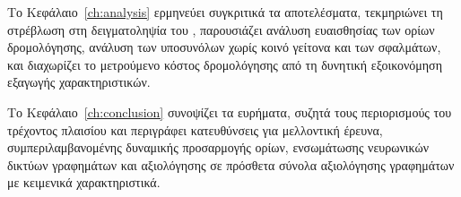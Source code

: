 Το Κεφάλαιο~\ref{ch:analysis} ερμηνεύει συγκριτικά τα αποτελέσματα, τεκμηριώνει
τη στρέβλωση στη δειγματοληψία του , παρουσιάζει ανάλυση ευαισθησίας των ορίων δρομολόγησης, ανάλυση των υποσυνόλων χωρίς κοινό γείτονα και των σφαλμάτων, και
διαχωρίζει το μετρούμενο κόστος δρομολόγησης από τη δυνητική εξοικονόμηση
εξαγωγής χαρακτηριστικών.

Το Κεφάλαιο~\ref{ch:conclusion} συνοψίζει τα ευρήματα, συζητά τους περιορισμούς του τρέχοντος
πλαισίου και περιγράφει κατευθύνσεις για μελλοντική έρευνα, συμπεριλαμβανομένης
δυναμικής προσαρμογής ορίων, ενσωμάτωσης νευρωνικών δικτύων γραφημάτων και αξιολόγησης
σε πρόσθετα σύνολα αξιολόγησης γραφημάτων με κειμενικά χαρακτηριστικά.
